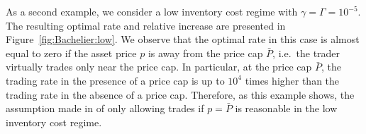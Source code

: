 \documentclass[11pt]{article}
\theoremstyle{definition}
\theoremstyle{remark}
\newcommand{\ts}{\textstyle}
\newcommand{\de}{\,\mathrm{d}}
\begin{document}
As a second example, we consider a low inventory cost regime with $\gamma = \Gamma = 10^{-5}$. The resulting optimal rate and relative increase are presented in Figure~\ref{fig:Bachelier:low}. We observe that the optimal rate in this case is almost equal to zero if the asset price $p$ is away from the price cap $\bar P$, i.e.\ the trader virtually trades only near the price cap. In particular, at the price cap $\bar P$, the trading rate in the presence of a price cap is up to $10^4$ times higher than the trading rate in the absence of a price cap. Therefore, as this example shows, the assumption made in \cite{neuman.schied.16} of only allowing trades if $p = \bar P$ is reasonable in the low inventory cost regime.










\end{document}
